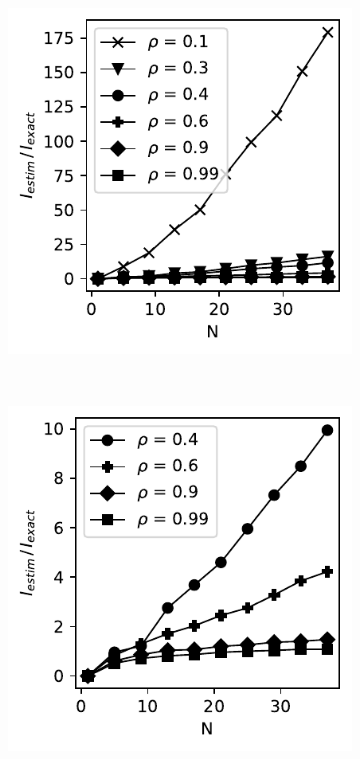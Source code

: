 \documentclass[../Thesis.tex]{subfiles}
\begin{document}

\begin{figure}[H]
    \centering
    \begin{subfigure}[t]{0.32\textwidth}
        \centering
        \includegraphics[width=\linewidth]{figures/ND examples/MI calc/gaussian example original all.pdf}
        \caption{}
        \label{subfig:d}
    \end{subfigure}%
    ~
    \begin{subfigure}[t]{0.32\textwidth}
        \centering
        \includegraphics[width=\linewidth]{figures/ND examples/MI calc/gaussian example original zoom.pdf}

\end{subfigure}
\end{figure}
\end{document}
